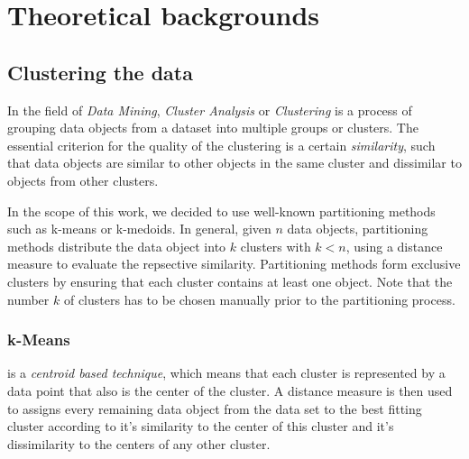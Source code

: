 \documentclass[runningheads]{llncs}
\begin{document}
	\section{Theoretical backgrounds}
	
	\subsection{Clustering the data}
	
	In the field of \textit{Data Mining}, \textit{Cluster Analysis} or \textit{Clustering} is a process of grouping data objects from a dataset into multiple groups or clusters. The essential criterion for the quality of the clustering is a certain \textit{similarity}, such that data objects are similar to other objects in the same cluster and dissimilar to objects from other clusters. 
	
	In the scope of this work, we decided to use well-known partitioning methods such as k-means or k-medoids. In general, given $n$ data objects, partitioning methods distribute the data object into $k$ clusters with $k<n$, using a distance measure to evaluate the repsective similarity. Partitioning methods form exclusive clusters by ensuring that each cluster contains at least one object. Note that the number $k$ of clusters has to be chosen manually prior to the partitioning process.
	
	\subsubsection{k-Means}
	
	is a \textit{centroid based technique}, which means that each cluster is represented by a data point that also is the center of the cluster. A distance measure is then used to assigns every remaining data object from the data set to the best fitting cluster according to it's similarity to the center of this cluster and it's dissimilarity to the centers of any other cluster.
	
\end{document}
